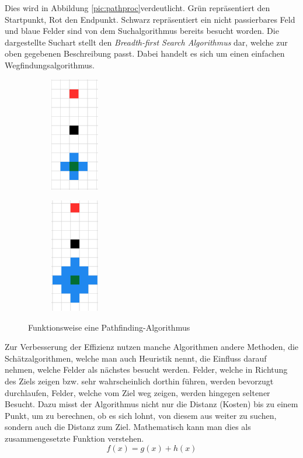 {{{{			
			Dies wird in Abbildung \ref{pic:pathproc}verdeutlicht. Grün repräsentiert den Startpunkt, Rot den Endpunkt. Schwarz repräsentiert ein nicht passierbares Feld und blaue Felder sind von dem Suchalgorithmus bereits besucht worden. 
			Die dargestellte Suchart stellt den \emph{Breadth-first Search Algorithmus} dar, welche zur oben gegebenen Beschreibung passt. Dabei handelt es sich um einen einfachen Wegfindungsalgorithmus.
			
			\begin{figure}[H]
				\captionsetup{width=.8\linewidth}
				\centering
				\begin{subfigure}[h]{.33\linewidth}
					\centering
					\includegraphics[scale=0.6, height =5cm]{Bilder/pathfinding_tiefe1.png}
					\label{pic:pathtiefe1}
				\end{subfigure}%
				\qquad %
				\begin{subfigure}[h]{.33\linewidth}
					\centering
					\includegraphics[scale=0.6, height =5cm]{Bilder/pathfinding_tiefe2.png}
					\label{pic:pathtiefe2}
				\end{subfigure}
				\caption{Funktionsweise eine Pathfinding-Algorithmus}
				\label{pic:pathtiefe}
			\end{figure}	
			
			Zur Verbesserung der Effizienz nutzen manche Algorithmen andere Methoden, die Schätzalgorithmen, welche man auch Heuristik nennt, die Einfluss darauf nehmen, welche Felder als nächstes besucht werden. Felder, welche in Richtung des Ziels zeigen bzw. sehr wahrscheinlich dorthin führen, werden bevorzugt durchlaufen, Felder, welche vom Ziel weg zeigen, werden hingegen seltener Besucht. Dazu misst der Algorithmus nicht nur die Distanz (Kosten) bis zu einem Punkt, um zu berechnen, ob es sich lohnt, von diesem aus weiter zu suchen, sondern auch die Distanz zum Ziel. Mathematisch kann man dies als zusammengesetzte Funktion verstehen.
			\begin{equation}
				f(x) = g(x) + h(x)
			\end{equation}
			
}}}}
